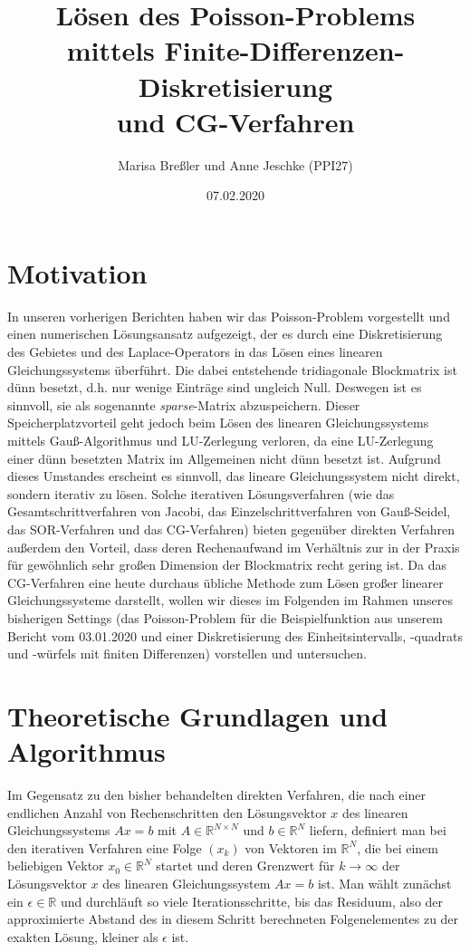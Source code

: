 \documentclass{scrartcl}
\begin{document}
\title{Lösen des Poisson-Problems mittels Finite-Differenzen-Diskretisierung\\
und CG-Verfahren}
\author{Marisa Breßler und Anne Jeschke (PPI27)}
\date{07.02.2020}
\maketitle

\tableofcontents

\pagebreak
\section{Motivation}
In unseren vorherigen Berichten haben wir das Poisson-Problem vorgestellt und einen numerischen Lösungsansatz aufgezeigt, der es durch eine Diskretisierung des Gebietes und des Laplace-Operators in das Lösen eines linearen Gleichungssystems überführt.
Die dabei entstehende tridiagonale Blockmatrix ist dünn besetzt, d.h. nur wenige Einträge sind ungleich Null.
Deswegen ist es sinnvoll, sie als sogenannte \textit{sparse}-Matrix abzuspeichern.
Dieser Speicherplatzvorteil geht jedoch beim Lösen des linearen Gleichungssystems mittels Gauß-Algorithmus und LU-Zerlegung verloren, da eine LU-Zerlegung einer dünn besetzten Matrix im Allgemeinen nicht dünn besetzt ist.
Aufgrund dieses Umstandes erscheint es sinnvoll, das lineare Gleichungssystem nicht direkt, sondern iterativ zu lösen.
Solche iterativen Lösungsverfahren (wie das Gesamtschrittverfahren von Jacobi, das Einzelschrittverfahren von Gauß-Seidel, das SOR-Verfahren und das CG-Verfahren) bieten gegenüber direkten Verfahren außerdem den Vorteil, dass deren Rechenaufwand im Verhältnis zur in der Praxis für gewöhnlich sehr großen Dimension der Blockmatrix recht gering ist.
Da das CG-Verfahren eine heute durchaus übliche Methode zum Lösen großer linearer Gleichungssysteme darstellt, wollen wir dieses im Folgenden im Rahmen unseres bisherigen Settings (das Poisson-Problem für die Beispielfunktion aus unserem Bericht vom 03.01.2020 und einer Diskretisierung des Einheitsintervalls, -quadrats und -würfels mit finiten Differenzen) vorstellen und untersuchen.



\pagebreak
\section{Theoretische Grundlagen und Algorithmus}

Im Gegensatz zu den bisher behandelten direkten Verfahren, die nach einer endlichen Anzahl von Rechenschritten den Lösungsvektor $x$ des linearen Gleichungssystems $Ax=b$ mit $A\in\mathbb{R}^{N\times N}$ und $b\in\mathbb{R}^N$ liefern, definiert man bei den iterativen Verfahren eine Folge $(x_k)$ von Vektoren im $\mathbb{R}^N$, die bei einem beliebigen Vektor $x_0\in\mathbb{R}^N$ startet und deren Grenzwert für $k \to \infty$ der Lösungsvektor $x$ des linearen Gleichungssystem $Ax=b$ ist.
Man wählt zunächst ein $\epsilon\in\mathbb{R}$ und durchläuft so viele Iterationsschritte, bis das Residuum, also der approximierte Abstand des in diesem Schritt berechneten Folgenelementes zu der exakten Lösung, kleiner als $\epsilon$ ist.
\end{document}
